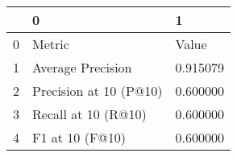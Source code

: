 \begin{tabular}{lll}
\toprule
 & 0 & 1 \\
\midrule
0 & Metric & Value \\
1 & Average Precision & 0.915079 \\
2 & Precision at 10 (P@10) & 0.600000 \\
3 & Recall at 10 (R@10) & 0.600000 \\
4 & F1 at 10 (F@10) & 0.600000 \\
\bottomrule
\end{tabular}
